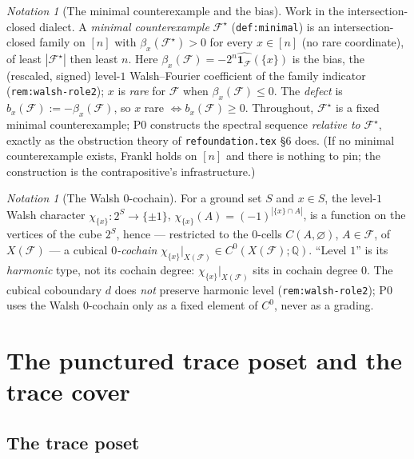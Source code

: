 \documentclass[11pt,oneside]{amsart}
\theoremstyle{plain}
\theoremstyle{definition}
\theoremstyle{remark}
\newtheorem{notation}[theorem]{Notation}
\theoremstyle{honeststyle}
\newcommand{\F}{\mathcal{F}}
\newcommand{\Fstar}{\F^{\star}}
\newcommand{\bias}{\beta}
\newcommand{\Q}{\mathbb{Q}}
\newcommand{\walsh}[1]{\chi_{#1}}
\begin{document}
\begin{notation}[The minimal counterexample and the bias]
\label{not:counterexample}
Work in the intersection-closed dialect. A \emph{minimal
counterexample} $\Fstar$ (\texttt{def:minimal}) is an
intersection-closed family on $[n]$ with $\bias_{x}(\Fstar)>0$ for
every $x\in[n]$ (no rare coordinate), of least $|\Fstar|$ then least
$n$. Here $\bias_{x}(\F)=-2^{n}\widehat{\mathbf 1_{\F}}(\{x\})$ is the
bias, the (rescaled, signed) level-$1$ Walsh--Fourier coefficient of
the family indicator (\texttt{rem:walsh-role2}); $x$ is \emph{rare}
for $\F$ when $\bias_{x}(\F)\le0$. The \emph{defect} is
$b_{x}(\F):=-\bias_{x}(\F)$, so $x$ rare $\iff b_{x}(\F)\ge0$.
Throughout, $\Fstar$ is a fixed minimal counterexample; P0 constructs
the spectral sequence \emph{relative to} $\Fstar$, exactly as the
obstruction theory of \texttt{refoundation.tex} \S6 does. (If no
minimal counterexample exists, Frankl holds on $[n]$ and there is
nothing to pin; the construction is the contrapositive's
infrastructure.)
\end{notation}

\begin{notation}[The Walsh $0$-cochain]
\label{not:walsh}
For a ground set $S$ and $x\in S$, the level-$1$ Walsh character
$\walsh{\{x\}}\colon2^{S}\to\{\pm1\}$, $\walsh{\{x\}}(A)=(-1)^{|\{x\}
\cap A|}$, is a function on the vertices of the cube $2^{S}$, hence ---
restricted to the $0$-cells $C(A,\varnothing)$, $A\in\F$, of $X(\F)$
--- a cubical \emph{$0$-cochain} $\walsh{\{x\}}|_{X(\F)}\in
C^{0}(X(\F);\Q)$. ``Level $1$'' is its \emph{harmonic} type, not its
cochain degree: $\walsh{\{x\}}|_{X(\F)}$ sits in cochain degree $0$.
The cubical coboundary $d$ does \emph{not} preserve harmonic level
(\texttt{rem:walsh-role2}); P0 uses the Walsh $0$-cochain only as a
fixed element of $C^{0}$, never as a grading.
\end{notation}

\section{The punctured trace poset and the trace cover}
\label{sec:poset}

\subsection{The trace poset}
\label{ssec:tracepost}
\end{document}
